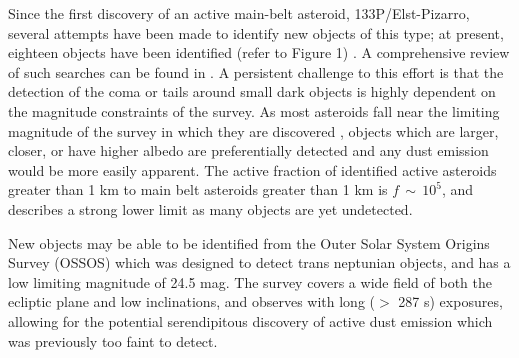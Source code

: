\documentclass[iop,apj]{emulateapj}
\begin{document}



Since the first discovery of an active main-belt asteroid, 133P/Elst-Pizarro, several attempts have been made to identify new objects of this type; at present, eighteen objects have been identified (refer to Figure 1) \citep{jewitt15}. A comprehensive review of such searches can be found in \citet{hsieh15}.  A persistent challenge to this effort is that the detection of the coma or tails around small dark objects is highly dependent on the magnitude constraints of the survey. As most asteroids fall near the limiting magnitude of the survey in which they are discovered \citep{jewitt15}%
, objects which are larger, closer, or have higher albedo are preferentially detected and any dust emission would be more easily apparent. The active fraction of identified active asteroids greater than 1 km to main belt asteroids greater than 1 km is $f \, \sim \, 10^5$, and describes a strong lower limit as many objects are yet undetected. \citep{jewitt15} %


New objects may be able to be identified from the Outer Solar System Origins Survey (OSSOS) which was designed to detect trans neptunian objects, and has a low limiting magnitude of 24.5 mag. The survey covers a wide field of both the ecliptic plane and low inclinations, and observes with long ($>$ 287 s) exposures, allowing for the potential serendipitous discovery of active dust emission which was previously too faint to detect.
\end{document}
